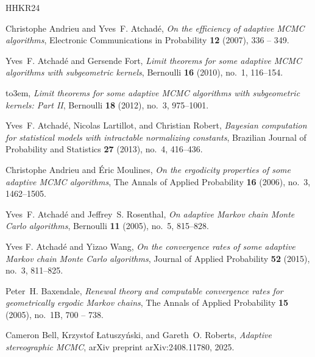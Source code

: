 \documentclass[12pt]{article}
\theoremstyle{definition}
\begin{document}
\providecommand{\bysame}{\leavevmode\hbox to3em{\hrulefill}\thinspace}
\providecommand{\MR}{\relax\ifhmode\unskip\space\fi MR }
\providecommand{\MRhref}[2]{%
	\href{http://www.ams.org/mathscinet-getitem?mr=#1}{#2}
}
\providecommand{\href}[2]{#2}
\begin{thebibliography}{HHKR24}
	
	Christophe Andrieu and Yves~F. Atchadé, \emph{On the efficiency of adaptive
		{MCMC} algorithms}, Electronic Communications in Probability \textbf{12}
	(2007), 336 -- 349.
	
	Yves~F. Atchadé and Gersende Fort, \emph{Limit theorems for some adaptive MCMC
		algorithms with subgeometric kernels}, Bernoulli \textbf{16} (2010), no.~1,
	116--154.
	
	\bysame, \emph{Limit theorems for some adaptive {MCMC} algorithms with
		subgeometric kernels: Part {II}}, Bernoulli \textbf{18} (2012), no.~3,
	975--1001.
	
	Yves~F. Atchadé, Nicolas Lartillot, and Christian Robert, \emph{Bayesian
		computation for statistical models with intractable normalizing constants},
	Brazilian Journal of Probability and Statistics \textbf{27} (2013), no.~4,
	416--436.
	
	Christophe Andrieu and {\'E}ric Moulines, \emph{On the ergodicity properties of
		some adaptive {MCMC} algorithms}, The Annals of Applied Probability
	\textbf{16} (2006), no.~3, 1462--1505.
	
	Yves~F. Atchadé and Jeffrey~S. Rosenthal, \emph{On adaptive {M}arkov chain
		{M}onte {C}arlo algorithms}, Bernoulli \textbf{11} (2005), no.~5, 815--828.
	
	Yves F. Atchad{\'e} and Yizao Wang, \emph{On the convergence rates of some
		adaptive Markov chain Monte Carlo algorithms}, Journal of Applied Probability
	\textbf{52} (2015), no.~3, 811--825.
	
	Peter~H. Baxendale, \emph{{Renewal theory and computable convergence rates for
			geometrically ergodic Markov chains}}, The Annals of Applied Probability
	\textbf{15} (2005), no.~1B, 700 -- 738.
	
	Cameron Bell, Krzystof {\L}atuszy{\'n}ski, and Gareth~O. Roberts,
	\emph{Adaptive stereographic MCMC}, arXiv preprint
	\href{https://arxiv.org/abs/2408.11780}{arXiv:2408.11780}, 2025.
	

\end{thebibliography}
\end{document}
